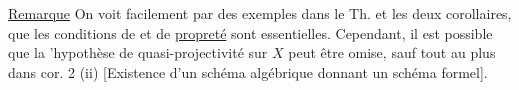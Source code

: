 \uline{Remarque} On voit facilement par des exemples dans le Th. et les deux corollaires, que les conditions de  et de \uline{propreté} sont essentielles. Cependant, il  est possible que la 'hypothèse de quasi-projectivité sur $X$   peut être omise,  sauf tout au plus dans cor. 2 (ii) [Existence d'un schéma algébrique donnant un schéma formel].
